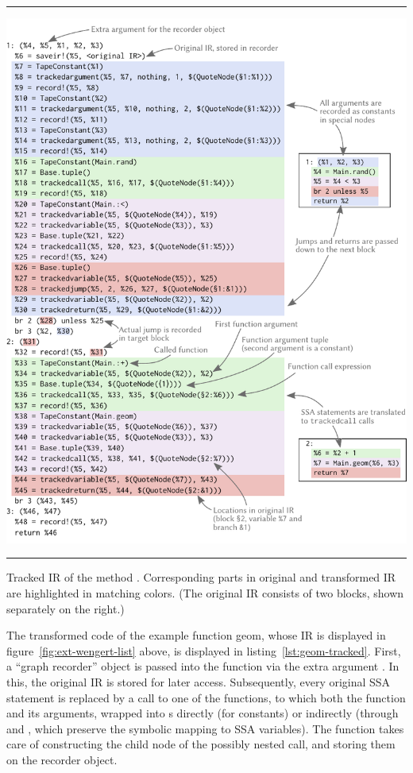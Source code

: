 \begin{lstfloat}[p]
  \hrule
  \includegraphics[width=\textwidth]{figures/translation}
  \hrule
  \caption{Tracked IR of the method \protect{}.  Corresponding parts in
    original and transformed IR are highlighted in matching colors.  (The original IR consists of
    two blocks, shown separately on the right.)\label{lst:geom-tracked}}
\end{lstfloat}

The transformed code of the example function geom, whose IR is displayed in
figure~\ref{fig:ext-wengert-list} above, is displayed in listing~\ref{lst:geom-tracked}.  First, a
\enquote{graph recorder} object is passed into the function via the extra argument .  In
this, the original IR is stored for later access.  Subsequently, every original SSA statement is
replaced by a call to one of the \protect{} functions, to which both the function and
its arguments, wrapped into s directly (for constants) or indirectly (through
 and , which preserve the symbolic mapping to SSA
variables).  The   function takes care of constructing the child node of the possibly
nested call, and storing them on the recorder object.

